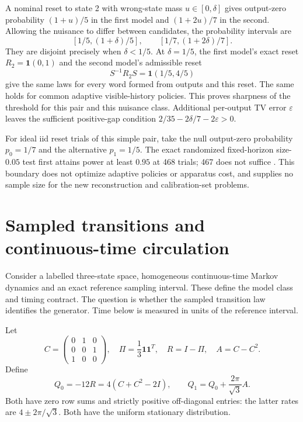 \documentclass[11pt,letterpaper]{article}
\newcommand{\one}{\mathbf1}
\begin{document}
A nominal reset to state 2 with wrong-state mass \(u\in[0,\delta]\) gives
output-zero probability \((1+u)/5\) in the first model and \((1+2u)/7\)
in the second. Allowing the nuisance to differ between candidates, the
probability intervals are
\[
 [1/5,(1+\delta)/5],\qquad [1/7,(1+2\delta)/7].
\]
They are disjoint precisely when \(\delta<1/5\).
At \(\delta=1/5\), the first model's exact reset \(R_2=\one(0,1)\) and
the second model's admissible reset
\[
 S^{-1}R_2S=\one(1/5,4/5)
\]
give the same laws for every word formed from outputs and this reset.
The same holds for common adaptive visible-history policies. This proves
sharpness of the threshold for this pair and this nuisance class.
Additional per-output TV error \(\varepsilon\) leaves the sufficient
positive-gap condition \(2/35-2\delta/7-2\varepsilon>0\).

For ideal iid reset trials of this simple pair, take the null output-zero
probability \(p_0=1/7\) and the alternative \(p_1=1/5\). The exact randomized
fixed-horizon size-\(0.05\) test first attains power at least \(0.95\) at
468 trials; 467 does not suffice \cite{internalintervention}. This boundary
does not optimize adaptive policies or apparatus cost, and supplies no
sample size for the new reconstruction and calibration-set problems.


\section{Sampled transitions and continuous-time circulation}

Consider a labelled three-state space, homogeneous continuous-time Markov dynamics and an exact reference sampling interval. These define the model class and timing contract. The question is whether the sampled transition law identifies the generator. Time below is measured in units of the reference interval.

Let
\[
 C=\begin{pmatrix}0&1&0\\0&0&1\\1&0&0\end{pmatrix},\quad
 \Pi=\frac13\one\one^T,\quad R=I-\Pi,\quad A=C-C^2.
\]
Define
\begin{equation}
 Q_0=-12R=4(C+C^2-2I),\qquad
 Q_1=Q_0+\frac{2\pi}{\sqrt3}A. \label{eq:generators}
\end{equation}
Both have zero row sums and strictly positive off-diagonal entries: the latter rates are $4\pm2\pi/\sqrt3$. Both have the uniform stationary distribution.
\end{document}
